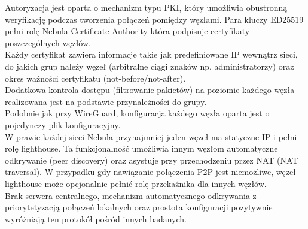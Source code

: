 Autoryzacja jest oparta o mechanizm typu PKI, który umożliwia obustronną weryfikację podczas tworzenia połączeń pomiędzy węzłami. Para kluczy ED25519 pełni rolę Nebula Certificate Authority która podpisuje certyfikaty poszczególnych węzłów.\\

Każdy certyfikat zawiera informacje takie jak predefiniowane IP wewnątrz sieci, do jakich grup należy węzeł (arbitralne ciągi znaków np. administratorzy) oraz okres ważności certyfikatu (not-before/not-after).\\

Dodatkowa kontrola dostępu (filtrowanie pakietów) na poziomie każdego węzła realizowana jest na podstawie przynależności do grupy.\\

Podobnie jak przy WireGuard, konfiguracja każdego węzła oparta jest o pojedynczy plik konfiguracyjny.\\

W prawie każdej sieci Nebula przynajmniej jeden węzeł ma statyczne IP i pełni rolę lighthouse. Ta funkcjonalność umożliwia innym węzłom automatyczne odkrywanie (peer discovery) oraz asystuje przy przechodzeniu przez NAT (NAT traversal). W przypadku gdy nawiązanie połączenia P2P jest niemożliwe, węzeł lighthouse może opcjonalnie pełnić rolę przekaźnika dla innych węzłów.\\

Brak serwera centralnego, mechanizm automatycznego odkrywania z priorytetyzacją połączeń lokalnych oraz prostota konfiguracji pozytywnie wyróżniają ten protokół pośród innych badanych.